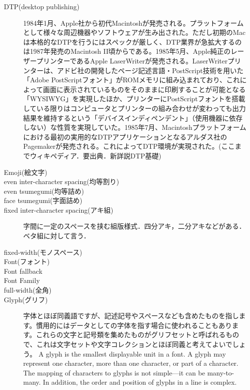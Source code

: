 \begin{description}
    \item[DTP(desktop publishing)]1984年1月、Apple社から初代Macintoshが発売される。プラットフォームとして様々な周辺機器やソフトウェアが生み出された。ただし初期のMacは本格的なDTPを行うにはスペックが厳しく、DTP業界が急拡大するのは1987年発売のMacintosh II頃からである。1985年5月、Apple純正のレーザープリンターであるApple LaserWriterが発売される。LaserWriterプリンターは、アドビ社の開発したページ記述言語・PostScript技術を用いた「Adobe PostScriptフォント」がROMメモリに組み込まれており、これによって画面に表示されているものをそのままに印刷することが可能となる「WYSIWYG」を実現したほか、プリンターにPostScriptフォントを搭載している限りはコンピュータとプリンターの組み合わせが変わっても出力結果を維持するという「デバイスインディペンデント」（使用機器に依存しない）な性質を実現していた。1985年7月、Macintoshプラットフォームにおける最初の実用的なDTPアプリケーションとなるアルダス社のPagemakerが発売される。これによってDTP環境が実現された。(ここまでウィキペディア．要出典．新詳説DTP基礎)
    \item[Emoji(絵文字)]
    \item[even inter-character spacing(均等割り)]
    \item[even tsumegumi(均等詰め)]
    \item[face tsumegumi(字面詰め)]
    \item[fixed inter-character spacing(アキ組)]字間に一定のスペースを挟む組版様式．四分アキ，二分アキなどがある．ベタ組に対して言う\cite{www.jpp.co.jp:yougo/a1.html}．
    \item[fixed-width(モノスペース)]
    \item[Font(フォント)]
    \item[Font fallback]
    \item[Font Family]
    \item[full-width(全角)]
    \item[Glyph(グリフ)]字体とほぼ同義語ですが、記述記号やスペースなども含めたものを指します。慣用的にはデータとしての字体を指す場合に使われることもあります。これらの文字と記号類を集めたものがグリフセットと呼ばれるもので、これは文字セットや文字コレクションとほぼ同義と考えてよいでしょう。 A glyph is the smallest displayable unit in a font. A glyph may represent one character, more than one character, or part of a character. The mapping of characters to glyphs is not simple—it can be many-to-many. In addition, the order and position of glyphs in a line is complex\cite{developer.apple.com:library/archive/documentation/MacOSX/Conceptual/BPInternational/InternationalizingYourCode/InternationalizingYourCode.html}.

\end{description}
